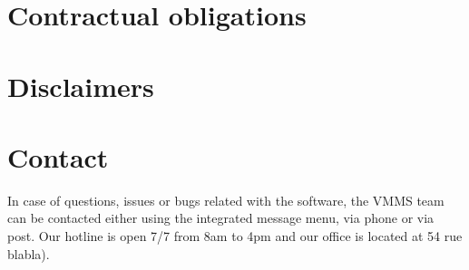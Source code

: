 \section{Contractual obligations}

\section{Disclaimers}

\section{Contact}
In case of questions, issues or bugs related with the software, the VMMS team
can be contacted either using the integrated message menu, via phone or via
post. Our hotline is open 7/7 from 8am to 4pm and our office is located
at 54 rue blabla).
